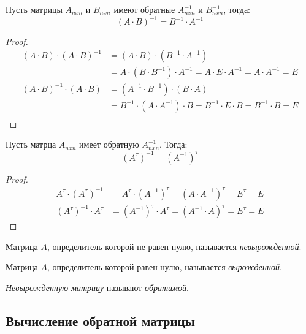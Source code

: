 \begin{theorem}
  Пусть матрицы $A_{n x n}$ и  $B_{n x n}$ имеют обратные $A^{-1}_{n x n}$ и  $B^{-1}_{n x n}$, тогда: \[
    (A \cdot B)^{-1} = B^{-1} \cdot A^{-1}
  \]
\end{theorem}
\begin{proof}
  \begin{align*}
    (A \cdot B) \cdot (A \cdot B)^{-1} &= (A \cdot B) \cdot (B^{-1} \cdot A^{-1}) \\ 
                          &= A \cdot (B \cdot B^{-1}) \cdot A^{-1} = A \cdot E \cdot A^{-1} = A \cdot A^{-1} = E \\
    (A \cdot B)^{-1} \cdot (A \cdot B) &= (A^{-1} \cdot B^{-1}) \cdot (B \cdot A) \\ 
                          &= B^{-1} \cdot (A \cdot A^{-1}) \cdot B = B^{-1} \cdot E \cdot B = B^{-1} \cdot B = E \\
  \end{align*}
\end{proof}

\begin{theorem}
  Пусть матрца $A_{nxn}$ имеет обратную $A^{-1}_{nxn}$. Тогда: \[
    \left( A^\tau \right) ^{-1} = \left( A^{-1} \right) ^\tau
  \] 
\end{theorem}
\begin{proof}
  \begin{align*}
    A^\tau \cdot (A^\tau)^{-1} &= A^\tau \cdot \left( A^{-1} \right)^\tau = (A \cdot A^{-1})^\tau = E^\tau = E \\
    (A^\tau)^{-1} \cdot A^\tau &= \left( A^{-1} \right)^\tau \cdot A^\tau = (A^{-1} \cdot A)^\tau = E^\tau = E
  \end{align*}
\end{proof}

\begin{definition}
  Матрица $A$, определитель которой не равен нулю, называется \textit{невырожденной}.
\end{definition}

\begin{definition}
  Матрица $A$, определитель которой равен нулю, называется \textit{вырожденной}.
\end{definition}

\begin{note}
  \textit{Невырожденную матрицу} называют \textit{обратимой}. 
\end{note}

\subsection{Вычисление обратной матрицы}

